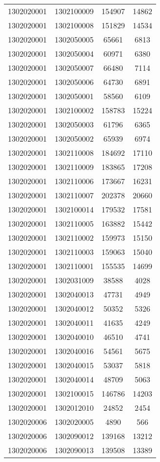 \begin{longtable}[h]{llcc}
		1302020001 & 1302100009 & 154907 & 14862\\
		1302020001 & 1302100008 & 151829 & 14534\\
		1302020001 & 1302050005 & 65661 & 6813\\
		1302020001 & 1302050004 & 60971 & 6380\\
		1302020001 & 1302050007 & 66480 & 7114\\
		1302020001 & 1302050006 & 64730 & 6891\\
		1302020001 & 1302050001 & 58560 & 6109\\
		1302020001 & 1302100002 & 158783 & 15224\\
		1302020001 & 1302050003 & 61796 & 6365\\
		1302020001 & 1302050002 & 65939 & 6974\\
		1302020001 & 1302110008 & 184692 & 17110\\
		1302020001 & 1302110009 & 183865 & 17208\\
		1302020001 & 1302110006 & 173667 & 16231\\
		1302020001 & 1302110007 & 202378 & 20660\\
		1302020001 & 1302100014 & 179532 & 17581\\
		1302020001 & 1302110005 & 163882 & 15442\\
		1302020001 & 1302110002 & 159973 & 15150\\
		1302020001 & 1302110003 & 159063 & 15040\\
		1302020001 & 1302110001 & 155535 & 14699\\
		1302020001 & 1302031009 & 38588 & 4028\\
		1302020001 & 1302040013 & 47731 & 4949\\
		1302020001 & 1302040012 & 50352 & 5326\\
		1302020001 & 1302040011 & 41635 & 4249\\
		1302020001 & 1302040010 & 46510 & 4741\\
		1302020001 & 1302040016 & 54561 & 5675\\
		1302020001 & 1302040015 & 53037 & 5818\\
		1302020001 & 1302040014 & 48709 & 5063\\
		1302020001 & 1302100015 & 146786 & 14203\\
		1302020001 & 1302012010 & 24852 & 2454\\
		1302020006 & 1302020005 & 4890 & 566\\
		1302020006 & 1302090012 & 139168 & 13212\\
		1302020006 & 1302090013 & 139508 & 13389\\

\end{longtable}
